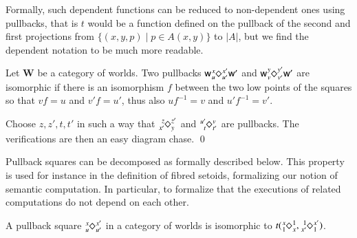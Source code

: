 \documentclass[orivec]{llncs}
\newif\iffull\fullfalse
\renewcommand{\paragraph}[1]{\noindent {\bf #1}}
\newcommand{\sq}[4]{\tensor*[^{#1}_{#2}]{\Diamond}{^{#3}_{#4}}}
\renewenvironment{proof}{\vspace{-1mm} \noindent {\bf Proof}\quad}{\qed}
\newcommand\w{\ensuremath{\mathsf{w}}\xspace}
\newcommand{\world}{\ensuremath{\mathbf{W}}\xspace}
\begin{document}
Formally, such dependent functions can be reduced to non-dependent ones
using pullbacks, that is $t$ would be a function defined on the pullback of
the second and first projections from $\{(x,y,p)\mid p\in A(x,y)\}$ to
$|A|$, but we find the dependent notation to be much more readable.


\paragraph{Isomorphic pullbacks}

\begin{definition}
Let $\world$ be a category of worlds.  Two pullbacks
$\w\sq{x}{u}{x'}{u'}\w'$ and $\w\sq{y}{v}{y'}{v'}\w'$ are isomorphic
if there is an isomorphism $f$ between the two low points of the
squares so that $vf=u$ and $v'f=u'$, thus also $uf^{-1}=v$ and
$u'f^{-1}=v'$.
\end{definition}
\fi\iffull
It is easy to see that pullback squares can be composed.
\begin{lemma}\label{preo}
  Given a category of worlds $\world$, such that $\w, \w', \w'' \in
\world$, 
  if $\w\sq{x}{u}{x'}{u'}\w'$ and $\w'\sq{y}{v}{y'}{v'}\w''$ are
  pullback squares as indicated then there exist $z,z',t,t'$ such that
  $\w\sq{zx}{ut}{z'y'}{v't'}\w''$ is also a pullback. 
\end{lemma}
\fi
\begin{proof}
  Choose $z,z',t,t'$ in such a way that $\sq{z}{x'}{z'}{y}$ and
  $\sq{u'}{t}{v}{t'}$ are pullbacks.  The verifications are then an
  easy diagram chase.
\end{proof}

Pullback squares can be decomposed as formally described below. This
property is used for instance in the definition of fibred setoids,
formalizing our notion of semantic computation. In particular, to
formalize that the executions of related computations do not depend on 
each other.

\begin{lemma}\label{decomp}
A pullback  square $\sq{x}{u}{x'}{u'}$ in a category of worlds is
isomorphic to $t(\sq{x}{1}{1}{x}, \sq{1}{x'}{x'}{1})$.
\end{lemma}
\end{document}
